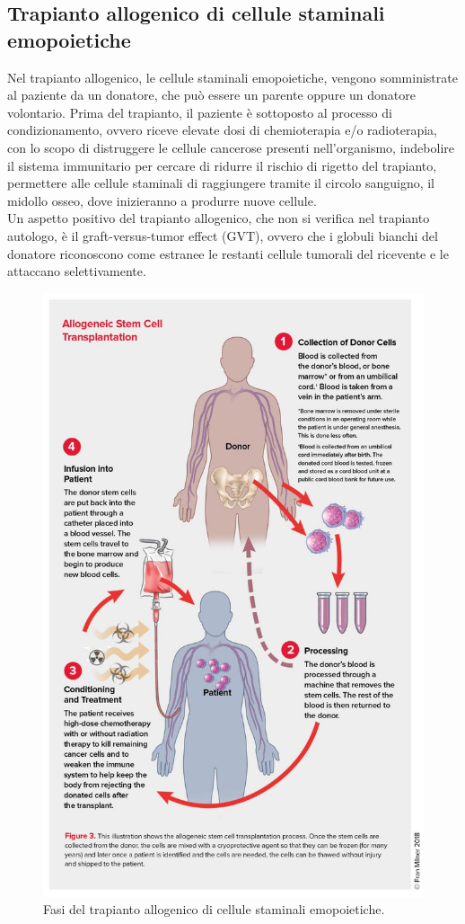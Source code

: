 \subsection{Trapianto allogenico di cellule staminali emopoietiche}

Nel trapianto allogenico, le cellule staminali emopoietiche, vengono somministrate al paziente da un donatore, 
che può essere un parente oppure un donatore volontario. 
Prima del trapianto, il paziente è sottoposto al processo di condizionamento, ovvero riceve elevate dosi di 
chemioterapia e/o radioterapia, con lo scopo di distruggere le cellule cancerose presenti nell’organismo, 
indebolire il sistema immunitario per cercare di ridurre il rischio di rigetto del trapianto, permettere alle 
cellule staminali di raggiungere tramite il circolo sanguigno, il midollo osseo, dove inizieranno a produrre nuove 
cellule.\\
Un aspetto positivo del trapianto allogenico, che non si verifica nel trapianto autologo, è il graft-versus-tumor 
effect (GVT), ovvero che i globuli bianchi del donatore riconoscono come estranee le restanti cellule tumorali 
del ricevente e le attaccano selettivamente\cite{LLSBLOOD}.\\

\begin{figure}[H]
    \begin{center}
    \includegraphics[width=0.7\columnwidth]{img/ALLOGENICO.jpg}
    \end{center}
    \caption[Fasi del trapianto allogenico di cellule staminali emopoietiche.]{Fasi del trapianto allogenico di cellule staminali emopoietiche.
    \cite{img37}}

\end{figure}

